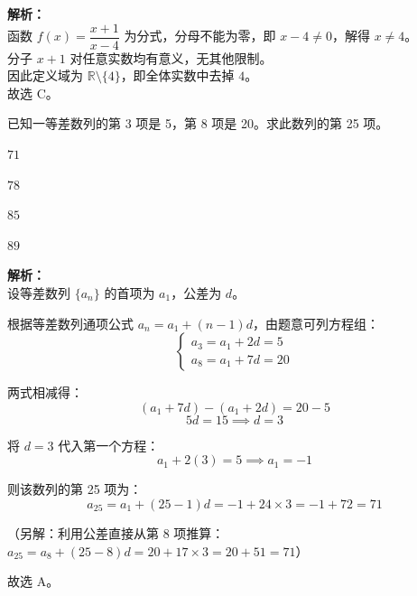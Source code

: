 \documentclass[12pt,a4paper]{exam-zh}
\begin{document}
\begin{solution}
    \textbf{解析：} \\
    函数 $f(x)=\dfrac{x+1}{x-4}$ 为分式，分母不能为零，即 $x-4\ne 0$，解得 $x\ne 4$。 \\
    分子 $x+1$ 对任意实数均有意义，无其他限制。 \\
    因此定义域为 $\mathbb{R}\setminus\{4\}$，即全体实数中去掉 $4$。 \\
    故选 C。
\end{solution}

\begin{question}
    已知一等差数列的第 3 项是 5，第 8 项是 20。求此数列的第 25 项。
    \begin{choices}
        \item $71$
        \item $78$
        \item $85$
        \item $89$
    \end{choices}
\end{question}
\begin{solution}
    \textbf{解析：} \\
    设等差数列 $\{a_n\}$ 的首项为 $a_1$，公差为 $d$。
    
    根据等差数列通项公式 $a_n = a_1 + (n-1)d$，由题意可列方程组：
    \[ \begin{cases} a_3 = a_1 + 2d = 5 \\ a_8 = a_1 + 7d = 20 \end{cases} \]
    
    两式相减得：
    \[ (a_1 + 7d) - (a_1 + 2d) = 20 - 5 \]
    \[ 5d = 15 \implies d = 3 \]
    
    将 $d = 3$ 代入第一个方程：
    \[ a_1 + 2(3) = 5 \implies a_1 = -1 \]
    
    则该数列的第 25 项为：
    \[ a_{25} = a_1 + (25-1)d = -1 + 24 \times 3 = -1 + 72 = 71 \]
    
    （另解：利用公差直接从第 8 项推算：$a_{25} = a_8 + (25-8)d = 20 + 17 \times 3 = 20 + 51 = 71$）
    
    故选 A。
\end{solution}
\end{document}
